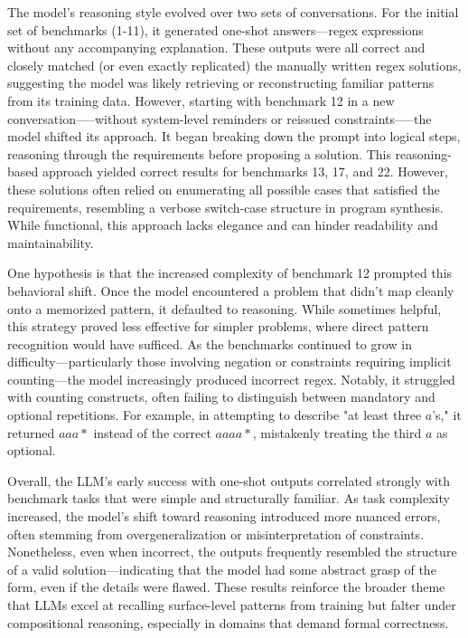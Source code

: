 \indent\indent The model's reasoning style evolved over two sets of conversations. For the initial set of benchmarks (1-11), it generated one-shot answers—regex expressions without any accompanying explanation. These outputs were all correct and closely matched (or even exactly replicated) the manually written regex solutions, suggesting the model was likely retrieving or reconstructing familiar patterns from its training data. However, starting with benchmark 12 in a new conversation--—without system-level reminders or reissued constraints--—the model shifted its approach. It began breaking down the prompt into logical steps, reasoning through the requirements before proposing a solution. This reasoning-based approach yielded correct results for benchmarks 13, 17, and 22. However, these solutions often relied on enumerating all possible cases that satisfied the requirements, resembling a verbose switch-case structure in program synthesis. While functional, this approach lacks elegance and can hinder readability and maintainability.

\indent\indent One hypothesis is that the increased complexity of benchmark 12 prompted this behavioral shift. Once the model encountered a problem that didn't map cleanly onto a memorized pattern, it defaulted to reasoning. While sometimes helpful, this strategy proved less effective for simpler problems, where direct pattern recognition would have sufficed. As the benchmarks continued to grow in difficulty—particularly those involving negation or constraints requiring implicit counting—the model increasingly produced incorrect regex. Notably, it struggled with counting constructs, often failing to distinguish between mandatory and optional repetitions. For example, in attempting to describe "at least three $a$'s," it returned $aaa*$ instead of the correct $aaaa*$, mistakenly treating the third $a$ as optional.

\indent\indent Overall, the LLM's early success with one-shot outputs correlated strongly with benchmark tasks that were simple and structurally familiar. As task complexity increased, the model's shift toward reasoning introduced more nuanced errors, often stemming from overgeneralization or misinterpretation of constraints. Nonetheless, even when incorrect, the outputs frequently resembled the structure of a valid solution—indicating that the model had some abstract grasp of the form, even if the details were flawed. These results reinforce the broader theme that LLMs excel at recalling surface-level patterns from training but falter under compositional reasoning, especially in domains that demand formal correctness.


